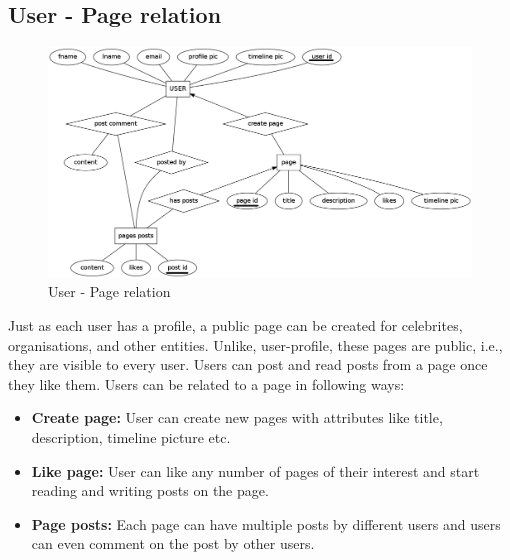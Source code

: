 \documentclass{article}
\begin{document}
\subsection{User - Page relation}
\begin{figure}[h]
\centering
\includegraphics[scale=0.35]{user_pages.png}
\caption{User - Page relation}
\label{fig2}
\end{figure}
Just as each user has a profile, a public page can be created for celebrites, organisations, and other entities. Unlike, user-profile, these pages are public, i.e., they are visible to every user. Users can post and read posts from a page once they like them. Users can be related to a page in following ways:
\begin{itemize}
\item \textbf{Create page:} User can create new pages with attributes like title, description, timeline picture etc.
\item \textbf{Like page:} User can like any number of pages of their interest and start reading and writing posts on the page.
\item \textbf{Page posts:} Each page can have multiple posts by different users and users can even comment on the post by other users.
\end{itemize}
\end{document}
